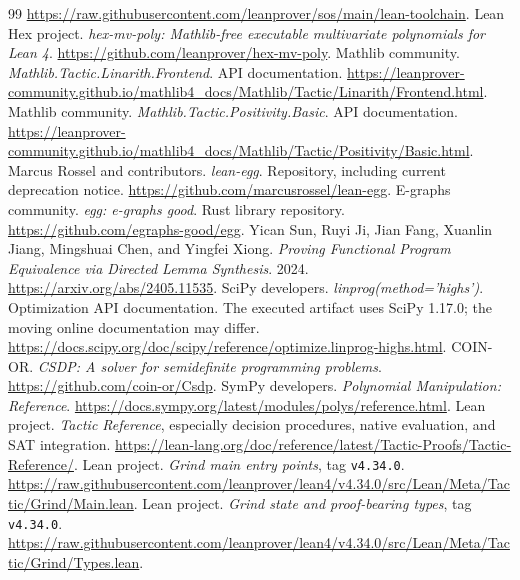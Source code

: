 \documentclass[11pt,a4paper]{article}
\newcommand{\code}[1]{\texttt{#1}}
\begin{document}
\begin{thebibliography}{99}
\url{https://raw.githubusercontent.com/leanprover/sos/main/lean-toolchain}.
 Lean Hex project. \emph{hex-mv-poly: Mathlib-free executable multivariate polynomials for Lean 4}.
\url{https://github.com/leanprover/hex-mv-poly}.
 Mathlib community. \emph{Mathlib.Tactic.Linarith.Frontend}. API documentation.
\url{https://leanprover-community.github.io/mathlib4_docs/Mathlib/Tactic/Linarith/Frontend.html}.
 Mathlib community. \emph{Mathlib.Tactic.Positivity.Basic}. API documentation.
\url{https://leanprover-community.github.io/mathlib4_docs/Mathlib/Tactic/Positivity/Basic.html}.
 Marcus Rossel and contributors. \emph{lean-egg}. Repository, including current deprecation notice.
\url{https://github.com/marcusrossel/lean-egg}.
 E-graphs community. \emph{egg: e-graphs good}. Rust library repository.
\url{https://github.com/egraphs-good/egg}.
 Yican Sun, Ruyi Ji, Jian Fang, Xuanlin Jiang, Mingshuai Chen, and Yingfei Xiong.
\emph{Proving Functional Program Equivalence via Directed Lemma Synthesis}. 2024.
\url{https://arxiv.org/abs/2405.11535}.
 SciPy developers. \emph{linprog(method='highs')}. Optimization API documentation.
The executed artifact uses SciPy 1.17.0; the moving online documentation may differ.
\url{https://docs.scipy.org/doc/scipy/reference/optimize.linprog-highs.html}.
 COIN-OR. \emph{CSDP: A solver for semidefinite programming problems}.
\url{https://github.com/coin-or/Csdp}.
 SymPy developers. \emph{Polynomial Manipulation: Reference}.
\url{https://docs.sympy.org/latest/modules/polys/reference.html}.
 Lean project. \emph{Tactic Reference}, especially decision procedures, native evaluation, and SAT integration.
\url{https://lean-lang.org/doc/reference/latest/Tactic-Proofs/Tactic-Reference/}.
 Lean project. \emph{Grind main entry points}, tag \code{v4.34.0}.
\url{https://raw.githubusercontent.com/leanprover/lean4/v4.34.0/src/Lean/Meta/Tactic/Grind/Main.lean}.
 Lean project. \emph{Grind state and proof-bearing types}, tag \code{v4.34.0}.
\url{https://raw.githubusercontent.com/leanprover/lean4/v4.34.0/src/Lean/Meta/Tactic/Grind/Types.lean}.
\end{thebibliography}
\end{document}
